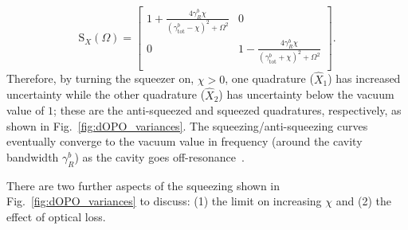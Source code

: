 \begin{equation} \label{eq:dOPO_fixed_phase}
\text{S}_X(\Omega)=\left[
\begin{array}{cc}
 1+\frac{4 \gamma^b_R \chi}{\left({\gamma^b_\text{tot}}-\chi\right)^2+\Omega ^2}
 & 0 \\
 0
 & 1-\frac{4 \gamma^b_R \chi}{\left({\gamma^b_\text{tot}}+\chi\right)^2+\Omega ^2} \\
\end{array}
\right].
\end{equation}
Therefore, by turning the squeezer on, $\chi>0$, one quadrature ($\hat X_1$) has increased uncertainty while the other quadrature ($\hat X_2$) has uncertainty below the vacuum value of $1$; these are the anti-squeezed and squeezed quadratures, respectively, as shown in Fig.~\ref{fig:dOPO_variances}. The squeezing/anti-squeezing curves eventually converge to the vacuum value in frequency (around the cavity bandwidth $\gamma^b_R$) as the cavity goes off-resonance~\cite{}. %

There are two further aspects of the squeezing shown in Fig.~\ref{fig:dOPO_variances} to discuss: (1) the limit on increasing $\chi$ and (2) the effect of optical loss.

\label{sec:dOPO_threshold}

